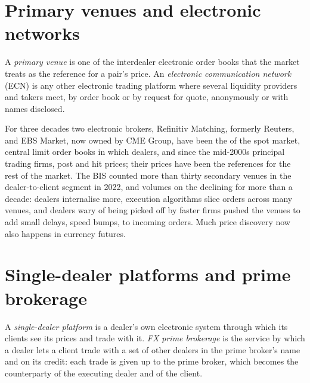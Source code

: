 \section{Primary venues and electronic networks}

\begin{definition}\label{def:m2:the-fx-market:venue}
A \emph{primary venue} is one of the interdealer electronic
order books that the market treats as the reference for a pair's price. An
\emph{electronic communication network}
(ECN) is any other electronic trading platform where several liquidity
providers and takers meet, by order book or by request for quote, anonymously
or with names disclosed.
\end{definition}

For three decades two electronic brokers, Refinitiv Matching, formerly
Reuters, and EBS Market, now owned by CME Group, have been the  of
the spot market,
central limit order books in which dealers, and since the mid-2000s principal
trading firms, post and hit prices; their prices have been the references for
the rest of the market. The BIS counted more than thirty secondary venues in the
dealer-to-client segment in 2022, and volumes on the  declining
for more than a decade: dealers internalise more, execution algorithms slice
orders across many venues, and dealers wary of being picked off by faster firms
pushed the venues to add small delays, speed bumps, to incoming orders.
Much price discovery now also happens in currency futures.

\section{Single-dealer platforms and prime brokerage}

\begin{definition}\label{def:m2:the-fx-market:sdp}
A \emph{single-dealer platform} is a dealer's own
electronic system through which its clients see its prices and trade with it.
\emph{FX prime brokerage} is the service by which a
dealer lets a client trade with a set of other dealers in the prime broker's name
and on its credit: each trade is given up to the prime broker, which becomes
the counterparty of the executing dealer and of the client.
\end{definition}

